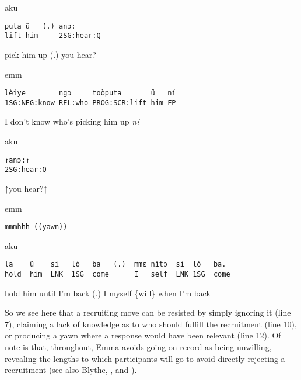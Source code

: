 \documentclass[output=paper]{langsci/langscibook}
\begin{document}
\vspace{2mm}
%
%
\begin{mdframednoverticalspace}[style=firstfoc]
%
\begin{transbox}{8}{aku}
\begin{verbatim}
puta ũ   (.) anɔ:
lift him     2SG:hear:Q
\end{verbatim}
 pick him up (.) you hear?
\end{transbox}
\end{mdframednoverticalspace}
%
%
\begin{transbox}{10}{emm}
\begin{verbatim}
lèiye        ngɔ     toòputa       ũ   ní
1SG:NEG:know REL:who PROG:SCR:lift him FP
\end{verbatim}
I don’t know who’s picking him up \textit{ní}
\end{transbox}
%
%
\begin{mdframednoverticalspace}[style=firstfoc]
\begin{transbox}{12}{aku}
\begin{verbatim}
↑anɔ:↑
2SG:hear:Q
\end{verbatim}
↑you hear?↑
\end{transbox}
\end{mdframednoverticalspace}
%
%
\begin{transbox}{13}{emm}
\begin{verbatim}
mmmhhh ((yawn))
\end{verbatim}
\end{transbox}
%
%
\begin{transbox}{15}{aku}
\begin{verbatim}
la    ũ    si   lò   ba   (.)  mmɛ nìtɔ  si  lò   ba.
hold  him  LNK  1SG  come      I   self  LNK 1SG  come
\end{verbatim}
hold him until I’m back (.) I myself \{will\} when I’m back
\end{transbox}\bigskip

\normalsize
So we see here that a recruiting move can be resisted by simply ignoring it (line 7), claiming a lack of knowledge as to who should fulfill the recruitment (line 10), or producing a yawn where a response would have been relevant (line 12). Of note is that, throughout, Emma avoids going on record as being unwilling, revealing the lengths to which participants will go to avoid directly rejecting a recruitment (see also Blythe, ,  and ).
\end{document}
